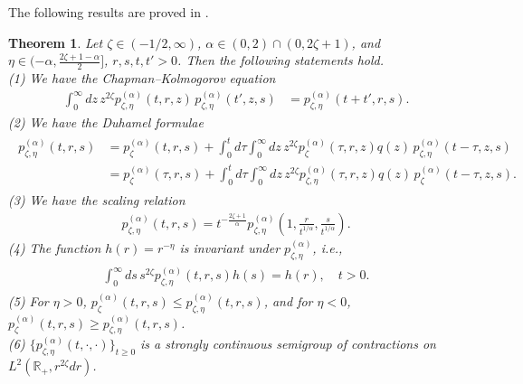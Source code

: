 \documentclass[12pt,reqno]{amsart}
\newtheorem{theorem}{Theorem}[section]
\theoremstyle{definition}
\theoremstyle{remark}
\numberwithin{equation}{section}
\newcommand{\1}{\mathbbm{1}}
\newcommand{\R}{\mathbb{R}}
\begin{document}
The following results are proved in \cite{Bogdanetal2024}.

\begin{theorem}
  \label{propertiesschrodheatkernel}
  Let $\zeta\in(-1/2,\infty)$, $\alpha\in(0,2)\cap(0,2\zeta+1)$, and $\eta\in(-\alpha,\frac{2\zeta+1-\alpha}{2}]$, $r,s,t,t'>0$. Then the following statements hold.\\
  \textup{(1)}
  We have the Chapman--Kolmogorov equation
  \begin{align}
    \int_0^\infty dz\, z^{2\zeta} p_{\zeta,\eta}^{(\alpha)}(t,r,z) \, p_{\zeta,\eta}^{(\alpha)}(t',z,s)
    & = p_{\zeta,\eta}^{(\alpha)}(t+t',r,s).
  \end{align}
  \textup{(2)}
  We have the Duhamel formulae
  \begin{align}
    \label{eq:duhamelclassictransformed}
    \begin{split}
      p_{\zeta,\eta}^{(\alpha)}(t,r,s)
      & = p_\zeta^{(\alpha)}(t,r,s) + \int_0^t d\tau \int_0^\infty dz\, z^{2\zeta} p_\zeta^{(\alpha)}(\tau,r,z) q(z)\, p_{\zeta,\eta}^{(\alpha)}(t-\tau,z,s) \\
      & = p_\zeta^{(\alpha)}(\tau,r,s) + \int_0^t d\tau \int_0^\infty dz\, z^{2\zeta} p_{\zeta,\eta}^{(\alpha)}(\tau,r,z) q(z)\, p_\zeta^{(\alpha)}(t-\tau,z,s).
    \end{split}
  \end{align}
  \textup{(3)}
  We have the scaling relation
  \begin{align}
    \label{eq:scalingalphahardy}
    p_{\zeta,\eta}^{(\alpha)}(t,r,s)
    = t^{-\frac{2\zeta+1}{\alpha}} p_{\zeta,\eta}^{(\alpha)}\left(1,\frac{r}{t^{1/\alpha}},\frac{s}{t^{1/\alpha}}\right).
  \end{align}
  \textup{(4)}
  The function $h(r)=r^{-\eta}$ is invariant under $p_{\zeta,\eta}^{(\alpha)}$, i.e.,
  \begin{align}
    \label{eq:supermediantransformedalphaintro}
    \begin{split}
      \int_0^\infty ds\, s^{2\zeta} p_{\zeta,\eta}^{(\alpha)}(t,r,s) h(s) = h(r), \quad t>0.
    \end{split}
  \end{align}
  \textup{(5)}
  For $\eta>0$, $p_\zeta^{(\alpha)}(t,r,s)\leq p_{\zeta,\eta}^{(\alpha)}(t,r,s)$, and for $\eta<0$, $p_\zeta^{(\alpha)}(t,r,s)\geq p_{\zeta,\eta}^{(\alpha)}(t,r,s)$.
  \\
  \textup{(6)}
  $\{p_{\zeta,\eta}^{(\alpha)}(t,\cdot,\cdot)\}_{t\geq0}$ is a strongly continuous semigroup of contractions on $L^2(\R_+,r^{2\zeta}dr)$.
\end{theorem}
\end{document}
